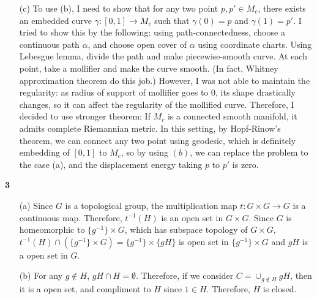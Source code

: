 \documentclass[a4paper, 12pt]{article}
\theoremstyle{Mydefinition}
\theoremstyle{Mytheorem}
\begin{document}
\begin{enumerate}
    \item[(c)] To use (b), I need to show that for any two point $p,p'\in M_c$, there exists an embedded curve $\gamma:[0,1]\rightarrow M_c$ such that $\gamma(0) = p$ and $\gamma(1) = p'$. I tried to show this by the following: using path-connectedness, choose a continuous path $\alpha$, and choose open cover of $\alpha$ using coordinate charts. Using Lebesgue lemma, divide the path and make piecewise-smooth curve. At each point, take a mollifier and make the curve smooth. (In fact, Whitney approximation theorem do this job.) However, I was not able to maintain the regularity: as radius of support of mollifier goes to $0$, its shape drastically changes, so it can affect the regularity of the mollified curve. Therefore, I decided to use stronger theorem: If $M_c$ is a connected smooth manifold, it admits complete Riemannian metric.\cite{10.2307/2034383} In this setting, by Hopf-Rinow's theorem, we can connect any two point using geodesic, which is definitely embedding of $[0,1]$ to $M_c$, so by using $(b)$, we can replace the problem to the case (a), and the displacement energy taking $p$ to $p'$ is zero.
\end{enumerate}

\noindent \textbf{3}
\begin{enumerate}
    \item[(a)] Since $G$ is a topological group, the multiplication map $t:G\times G\rightarrow G$ is a continuous map. Therefore, $t^{-1}(H)$ is an open set in $G \times G$. Since $G$ is homeomorphic to $\{g^{-1}\}\times G$, which has subspace topology of $G\times G$, $t^{-1}(H) \cap (\{g^{-1}\}\times G) = \{g^{-1}\}\times \{gH\}$ is open set in $\{g^{-1}\}\times G$ and $gH$ is a open set in $G$.
    \item[(b)] For any $g\not\in H$, $gH\cap H=\emptyset$. Therefore, if we consider $C = \cup_{g\not\in H}gH$, then it is a open set, and compliment to $H$ since $1\in H$. Therefore, $H$ is closed.
\end{enumerate}
\end{document}
